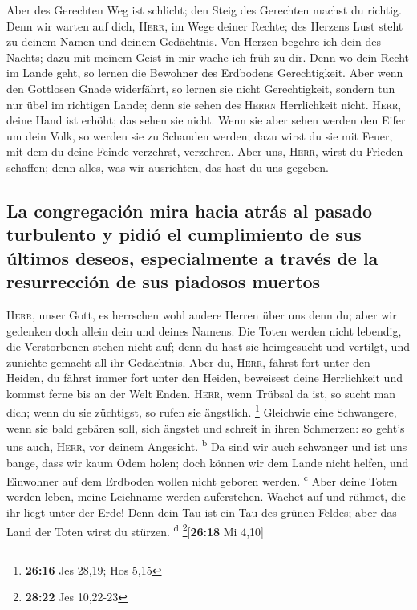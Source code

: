  Aber des Gerechten Weg ist schlicht; den Steig des
Gerechten machst du richtig.  Denn wir warten auf dich,
\textsc{Herr}, im Wege deiner Rechte; des Herzens Lust steht zu deinem
Namen und deinem Gedächtnis.  Von Herzen begehre ich dein
des Nachts; dazu mit meinem Geist in mir wache ich früh zu dir. Denn wo
dein Recht im Lande geht, so lernen die Bewohner des Erdbodens
Gerechtigkeit.  Aber wenn den Gottlosen Gnade widerfährt,
so lernen sie nicht Gerechtigkeit, sondern tun nur übel im richtigen
Lande; denn sie sehen des \textsc{Herrn} Herrlichkeit nicht.
 \textsc{Herr}, deine Hand ist erhöht; das sehen sie
nicht. Wenn sie aber sehen werden den Eifer um dein Volk, so werden sie
zu Schanden werden; dazu wirst du sie mit Feuer, mit dem du deine Feinde
verzehrst, verzehren.  Aber uns, \textsc{Herr}, wirst du
Frieden schaffen; denn alles, was wir ausrichten, das hast du uns
gegeben.

\hypertarget{la-congregaciuxf3n-mira-hacia-atruxe1s-al-pasado-turbulento-y-pidiuxf3-el-cumplimiento-de-sus-uxfaltimos-deseos-especialmente-a-travuxe9s-de-la-resurrecciuxf3n-de-sus-piadosos-muertos}{%
\subsection{La congregación mira hacia atrás al pasado turbulento y
pidió el cumplimiento de sus últimos deseos, especialmente a través de
la resurrección de sus piadosos
muertos}\label{la-congregaciuxf3n-mira-hacia-atruxe1s-al-pasado-turbulento-y-pidiuxf3-el-cumplimiento-de-sus-uxfaltimos-deseos-especialmente-a-travuxe9s-de-la-resurrecciuxf3n-de-sus-piadosos-muertos}}

 \textsc{Herr}, unser Gott, es herrschen wohl andere
Herren über uns denn du; aber wir gedenken doch allein dein und deines
Namens.  Die Toten werden nicht lebendig, die
Verstorbenen stehen nicht auf; denn du hast sie heimgesucht und
vertilgt, und zunichte gemacht all ihr Gedächtnis.  Aber
du, \textsc{Herr}, fährst fort unter den Heiden, du fährst immer fort
unter den Heiden, beweisest deine Herrlichkeit und kommst ferne bis an
der Welt Enden.  \textsc{Herr}, wenn Trübsal da ist, so
sucht man dich; wenn du sie züchtigst, so rufen sie ängstlich.
\footnote{\textbf{26:16} Jes 28,19; Hos 5,15}  Gleichwie
eine Schwangere, wenn sie bald gebären soll, sich ängstet und schreit in
ihren Schmerzen: so geht's uns auch, \textsc{Herr}, vor deinem
Angesicht. \textsuperscript{b}  Da sind wir auch
schwanger und ist uns bange, dass wir kaum Odem holen; doch können wir
dem Lande nicht helfen, und Einwohner auf dem Erdboden wollen nicht
geboren werden. \textsuperscript{c}  Aber deine Toten
werden leben, meine Leichname werden auferstehen. Wachet auf und rühmet,
die ihr liegt unter der Erde! Denn dein Tau ist ein Tau des grünen
Feldes; aber das Land der Toten wirst du stürzen. \textsuperscript{d}
\footnote{\textbf{28:22} Jes 10,22-23}{[}\textbf{26:18} Mi 4,10{]}

